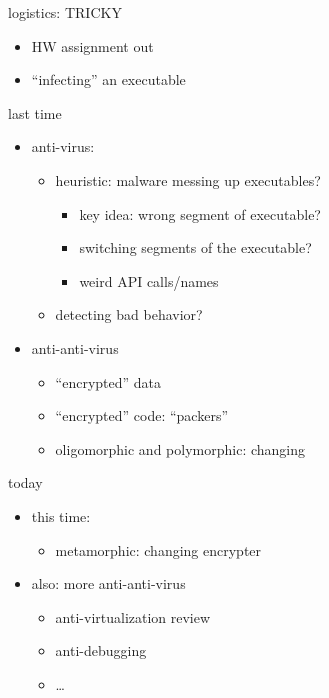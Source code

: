 \begin{frame}
    \titlepage
\end{frame}

\begin{frame}{logistics: TRICKY}
    \begin{itemize}
    \item HW assignment out
    \item ``infecting'' an executable
    \end{itemize}
\end{frame}

\begin{frame}{last time}
    \begin{itemize}
    \item anti-virus:
    \begin{itemize}
        \item heuristic: malware messing up executables?
            \begin{itemize}
            \item key idea: wrong segment of executable?
            \item switching segments of the executable?
            \item weird API calls/names
            \end{itemize}
        \item detecting bad behavior?
    \end{itemize}
    \item anti-anti-virus
        \begin{itemize}
        \item ``encrypted'' data
        \item ``encrypted'' code: ``packers''
        \item oligomorphic and polymorphic: changing 
        \end{itemize}
    \end{itemize}
\end{frame}

\begin{frame}{today}
    \begin{itemize}
    \item this time:
        \begin{itemize}
        \item metamorphic: changing encrypter 
        \end{itemize}
    \item also: more anti-anti-virus
        \begin{itemize}
        \item anti-virtualization review
        \item anti-debugging
        \item \ldots
        \end{itemize}
    \end{itemize}
\end{frame}

